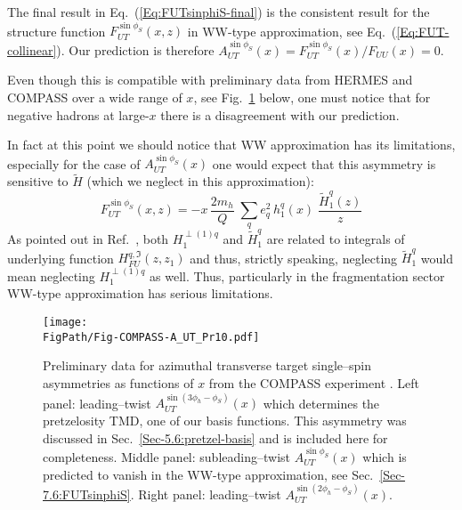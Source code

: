 \documentclass[a4paper,11pt]{article}
\newcommand*{\FigPath}{./figs}%
\begin{document}
The final result in Eq.~(\ref{Eq:FUTsinphiS-final}) is the
consistent result for the structure function $F_{UT}^{\sin\phi_S}(x,z)$ in 
WW-type approximation, see Eq.~(\ref{Eq:FUT-collinear}). Our prediction 
is therefore $A_{UT}^{\sin\phi_S}(x)=F_{UT}^{\sin\phi_S}(x)/F_{UU}(x)=0$.
{\color{green} Even though this is compatible with preliminary data from HERMES \cite{Schnell:2010zza}
and COMPASS \cite{Parsamyan:2015dfa} over a wide range of $x$, see 
Fig.~\ref{autsinphi_jlab} below, one must notice that for negative hadrons at 
large-$x$ there is a disagreement with our prediction.

In fact at this point we should notice that WW approximation has its limitations, especially for the case of $A_{UT}^{\sin\phi_S}(x)$ one would expect that this asymmetry is sensitive to $\tilde H$ (which we neglect in this approximation):
\begin{equation}
F_{UT}^{\sin\phi_S}(x,z) 
	= -x \,\frac{2m_h}{Q}\;\sum_q e_q^2\,
	h_1^{q}(x)\; \frac{\tilde H_1^{q}(z)}{z} 
\end{equation}	
As pointed out in Ref.~\cite{Kanazawa:2015ajw}, both $H_1^{\perp(1)q}$ and $\tilde H_1^{q}$ are related to integrals of underlying function $H_{FU}^{q,\Im}(z,z_1)$ and thus, strictly  speaking, neglecting $\tilde H_1^{q}$ would mean neglecting  $H_1^{\perp(1)q}$ as well. Thus, particularly in the fragmentation sector WW-type approximation has serious limitations.}

\begin{figure}[b]
\centering
\texttt{[image: \\FigPath/Fig-COMPASS-A\_UT\_Pr10.pdf]}

\vspace{-5mm}

\caption{\label{autsinphi_jlab} 
	Preliminary data for azimuthal transverse target single--spin 
	asymmetries as functions of $x$ from the COMPASS experiment 
	\cite{Parsamyan:2015dfa}.
	Left panel: 
	leading--twist $A_{UT}^{\sin(3\phi_h-\phi_S)}(x)$ which 
	determines the pretzelosity TMD, one of our basis functions. 
	This asymmetry was discussed in Sec.~\ref{Sec-5.6:pretzel-basis} 
	and is included here for completeness. 
	Middle panel: 
	subleading--twist $A_{UT}^{\sin\phi_S}(x)$ which is predicted to vanish
	in the WW-type approximation, see Sec.~\ref{Sec-7.6:FUTsinphiS}.
	Right panel: 
	leading--twist $A_{UT}^{\sin(2\phi_h-\phi_S)}(x)$.}
\end{figure}
\end{document}
